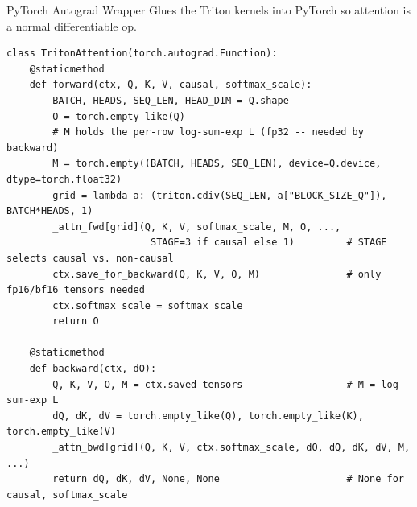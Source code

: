 \begin{frame}[fragile]{PyTorch Autograd Wrapper}
  Glues the Triton kernels into PyTorch so attention is a normal differentiable op.

\begin{lstlisting}
class TritonAttention(torch.autograd.Function):
    @staticmethod
    def forward(ctx, Q, K, V, causal, softmax_scale):
        BATCH, HEADS, SEQ_LEN, HEAD_DIM = Q.shape
        O = torch.empty_like(Q)
        # M holds the per-row log-sum-exp L (fp32 -- needed by backward)
        M = torch.empty((BATCH, HEADS, SEQ_LEN), device=Q.device, dtype=torch.float32)
        grid = lambda a: (triton.cdiv(SEQ_LEN, a["BLOCK_SIZE_Q"]), BATCH*HEADS, 1)
        _attn_fwd[grid](Q, K, V, softmax_scale, M, O, ...,
                         STAGE=3 if causal else 1)         # STAGE selects causal vs. non-causal
        ctx.save_for_backward(Q, K, V, O, M)               # only fp16/bf16 tensors needed
        ctx.softmax_scale = softmax_scale
        return O

    @staticmethod
    def backward(ctx, dO):
        Q, K, V, O, M = ctx.saved_tensors                  # M = log-sum-exp L
        dQ, dK, dV = torch.empty_like(Q), torch.empty_like(K), torch.empty_like(V)
        _attn_bwd[grid](Q, K, V, ctx.softmax_scale, dO, dQ, dK, dV, M, ...)
        return dQ, dK, dV, None, None                      # None for causal, softmax_scale
\end{lstlisting}
\end{frame}

